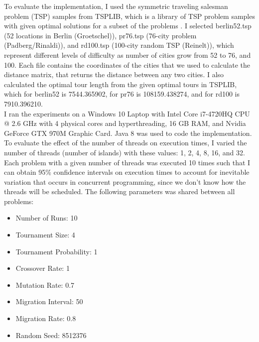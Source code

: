 \documentclass[10pt,journal,compsoc]{IEEEtran}
\begin{document}
To evaluate the implementation, I used the symmetric traveling salesman problem (TSP) samples from TSPLIB, which is a library of TSP problem samples with given optimal solutions for a subset of the problems \cite{TSPLIB2013}. I selected berlin52.tsp (52 locations in Berlin (Groetschel)), pr76.tsp (76-city problem (Padberg/Rinaldi)), and rd100.tsp (100-city random TSP (Reinelt)), which represent different levels of difficulty as number of cities grow from 52 to 76, and 100. Each file contains the coordinates of the cities that we used to calculate the distance matrix, that returns the distance between any two cities. I also calculated the optimal tour length from the given optimal tours in TSPLIB, which for berlin52 is 7544.365902, for pr76 is 108159.438274, and for rd100 is 7910.396210.\\
I ran the experiments on a Windows 10 Laptop with Intel Core i7-4720HQ CPU @ 2.6 GHz with 4 physical cores and hyperthreading, 16 GB RAM, and Nvidia GeForce GTX 970M Graphic Card. Java 8 was used to code the implementation.\\
To evaluate the effect of the number of threads on execution times, I varied the number of threads (number of islands) with these values: 1, 2, 4, 8, 16, and 32. Each problem with a given number of threads was executed 10 times such that I can obtain 95\% confidence intervals on execution times to account for inevitable variation that occurs in concurrent programming, since we don’t know how the threads will be scheduled. The following parameters was shared between all problems:

\begin{itemize}
    \item Number of Runs: 10
    \item Tournament Size: 4
    \item Tournament Probability: 1
    \item Crossover Rate: 1
    \item Mutation Rate: 0.7
    \item Migration Interval: 50
    \item Migration Rate: 0.8
    \item Random Seed: 8512376
\end{itemize}
\end{document}
